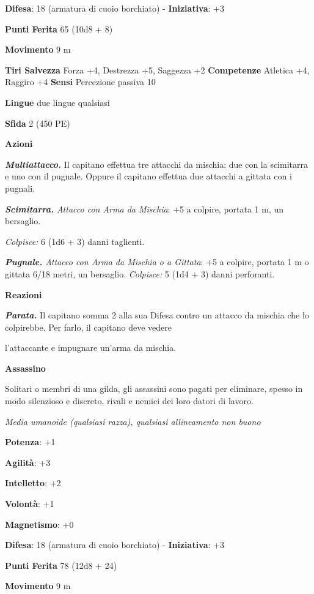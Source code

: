 \begin{multicols}{2}
\textbf{Difesa}: 18 (armatura di cuoio borchiato) - \textbf{Iniziativa}: +3

\textbf{Punti Ferita} 65 (10d8 + 8)

\textbf{Movimento} 9 m

\textbf{Tiri Salvezza} Forza +4, Destrezza +5, Saggezza +2
\textbf{Competenze} Atletica +4, Raggiro +4 \textbf{Sensi} Percezione
passiva 10

\textbf{Lingue} due lingue qualsiasi

\textbf{Sfida} 2 (450 PE)\smallskip

\smallskip\textbf{Azioni}

\emph{\textbf{Multiattacco.}} Il capitano effettua tre attacchi da
mischia: due con la scimitarra e uno con il pugnale. Oppure il capitano
effettua due attacchi a gittata con i pugnali.

\emph{\textbf{Scimitarra.} Attacco con Arma da Mischia}: +5 a colpire,
portata 1 m, un bersaglio.

\emph{Colpisce:} 6 (1d6 + 3) danni taglienti.

\emph{\textbf{Pugnale.} Attacco con Arma da Mischia o a Gittata}: +5 a
colpire, portata 1 m o gittata 6/18 metri, un bersaglio.
\emph{Colpisce:} 5 (1d4 + 3) danni perforanti.

\textbf{Reazioni}

\emph{\textbf{Parata.}} Il capitano somma 2 alla sua Difesa contro un
attacco da mischia che lo colpirebbe. Per farlo, il capitano deve vedere

l'attaccante e impugnare un'arma da mischia.

\textbf{Assassino}

Solitari o membri di una gilda, gli assassini sono pagati per eliminare,
spesso in modo silenzioso e discreto, rivali e nemici dei loro datori di
lavoro.

\emph{Media umanoide (qualsiasi razza), qualsiasi allineamento non
buono}

\textbf{Potenza}: +1

\textbf{Agilità}: +3

\textbf{Intelletto}: +2

\textbf{Volontà}: +1

\textbf{Magnetismo}: +0

\textbf{Difesa}: 18 (armatura di cuoio borchiato) - \textbf{Iniziativa}: +3

\textbf{Punti Ferita} 78 (12d8 + 24)

\textbf{Movimento} 9 m


\end{multicols}
